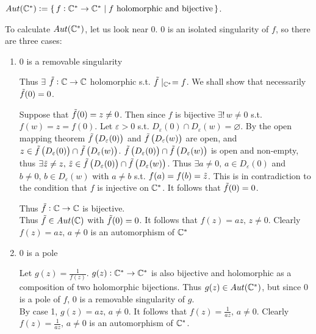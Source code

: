 \begin{example}[$Aut(\C^*)$]

$Aut(\mathbb{C}^*) \vcentcolon = \set{f:\mathbb{C}^* \to \mathbb{C}^* \mid f \text{ holomorphic and bijective} }$.

To calculate $Aut(\C^*)$, let us look near $0$. $0$ is an isolated singularity of $f$, so there are three cases:


\begin{enumerate}
    \item $0$ is a removable singularity
    
    Thus $\exists$ $\Tilde{f}: \mathbb{C} \to \mathbb{C}$ holomorphic s.t. $\Tilde{f} \mid_{\mathbb{C}^*} = f$. We shall show that necessarily $\Tilde{f} (0) =0$.
    
    Suppose that $\Tilde{f} (0) = z \neq 0$. Then since $f$ is bijective $\exists ! \, w \neq 0$ s.t. $f(w) = z = f(0)$. Let $\varepsilon >0$ s.t. $D_\varepsilon(0) \cap D_\varepsilon(w) = \varnothing$. By the open mapping theorem $\Tilde{f} \left( D_\varepsilon(0) \right) $ and $\Tilde{f} \left( D_\varepsilon(w) \right) $ are open, and $z \in \Tilde{f} \left( D_\varepsilon(0) \right) \cap \Tilde{f} \left( D_\varepsilon(w) \right) $. $\Tilde{f} \left( D_\varepsilon(0) \right) \cap \Tilde{f} \left( D_\varepsilon(w) \right) $ is open and non-empty, thus $\exists \Tilde{z} \neq z, \, \Tilde{z} \in \Tilde{f} \left( D_\varepsilon(0) \right) \cap \Tilde{f} \left( D_\varepsilon(w) \right) $. Thus $\exists a \neq 0, \, a \in D_\varepsilon (0)$ and $b \neq 0, \, b \in D_\varepsilon (w)$ with $a \neq b$ s.t. $f(a) = f(b) = \Tilde{z}$. This is in contradiction to the condition that $f$ is injective on $\mathbb{C} ^*$. It follows that $\Tilde{f}(0) = 0$.
    
    
    Thus $\Tilde{f}: \mathbb{C} \to \mathbb{C}$ is bijective.\\
    
    Thus $\Tilde{f} \in Aut(\mathbb{C})$ with $\Tilde{f} (0) = 0$. It follows that $f(z) = az, \, z \neq 0$. Clearly $f(z) = az, \, a \neq 0$ is an automorphism of $\mathbb{C}^*$
    
    \item $0$ is a pole
    
    Let $g(z) = \frac{1}{f(z)}$. $g(z):\mathbb{C}^* \to \mathbb{C}^* $ is also bijective and holomorphic as a composition of two holomorphic bijections. Thus $g(z) \in Aut(\mathbb{C}^*)$, but since $0$ is a pole of $f$, $0$ is a removable singularity of $g$.\\
    
    By case 1, $g(z) = az, \, a \neq 0$. It follows that $f(z) = \frac{1}{az}, \, a \neq 0$. Clearly \\ $f(z) = \frac{1}{az}, \, a \neq 0$ is an automorphism of $\mathbb{C} ^*$.
    

\end{enumerate}
\end{example}
